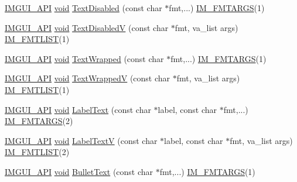 \begin{DoxyCompactItemize}
\item 
\hyperlink{imgui_8h_a43829975e84e45d1149597467a14bbf5}{I\+M\+G\+U\+I\+\_\+\+A\+PI} \hyperlink{imgui__impl__opengl3__loader_8h_ac668e7cffd9e2e9cfee428b9b2f34fa7}{void} \hyperlink{namespaceImGui_aa96bf14c5fa288e106820aeb4ba7fcb6}{Text\+Disabled} (const char $\ast$fmt,...) \hyperlink{imgui_8h_a1251c2f9ddac0873dbad8181bd82c9f1}{I\+M\+\_\+\+F\+M\+T\+A\+R\+GS}(1)
\item 
\hyperlink{imgui_8h_a43829975e84e45d1149597467a14bbf5}{I\+M\+G\+U\+I\+\_\+\+A\+PI} \hyperlink{imgui__impl__opengl3__loader_8h_ac668e7cffd9e2e9cfee428b9b2f34fa7}{void} \hyperlink{namespaceImGui_a5b128d4f12d7e33e95fb9cef7dce027e}{Text\+DisabledV} (const char $\ast$fmt, va\+\_\+list args) \hyperlink{imgui_8h_a047693beb7f899f5deab1e20202016b3}{I\+M\+\_\+\+F\+M\+T\+L\+I\+ST}(1)
\item 
\hyperlink{imgui_8h_a43829975e84e45d1149597467a14bbf5}{I\+M\+G\+U\+I\+\_\+\+A\+PI} \hyperlink{imgui__impl__opengl3__loader_8h_ac668e7cffd9e2e9cfee428b9b2f34fa7}{void} \hyperlink{namespaceImGui_ad57bb15c599e73b2ccc7c0f7de6e5823}{Text\+Wrapped} (const char $\ast$fmt,...) \hyperlink{imgui_8h_a1251c2f9ddac0873dbad8181bd82c9f1}{I\+M\+\_\+\+F\+M\+T\+A\+R\+GS}(1)
\item 
\hyperlink{imgui_8h_a43829975e84e45d1149597467a14bbf5}{I\+M\+G\+U\+I\+\_\+\+A\+PI} \hyperlink{imgui__impl__opengl3__loader_8h_ac668e7cffd9e2e9cfee428b9b2f34fa7}{void} \hyperlink{namespaceImGui_a9019a388cd0c410bcb3d3ae63a008123}{Text\+WrappedV} (const char $\ast$fmt, va\+\_\+list args) \hyperlink{imgui_8h_a047693beb7f899f5deab1e20202016b3}{I\+M\+\_\+\+F\+M\+T\+L\+I\+ST}(1)
\item 
\hyperlink{imgui_8h_a43829975e84e45d1149597467a14bbf5}{I\+M\+G\+U\+I\+\_\+\+A\+PI} \hyperlink{imgui__impl__opengl3__loader_8h_ac668e7cffd9e2e9cfee428b9b2f34fa7}{void} \hyperlink{namespaceImGui_ad92ccfbc33d448ff40cfcf9219177344}{Label\+Text} (const char $\ast$label, const char $\ast$fmt,...) \hyperlink{imgui_8h_a1251c2f9ddac0873dbad8181bd82c9f1}{I\+M\+\_\+\+F\+M\+T\+A\+R\+GS}(2)
\item 
\hyperlink{imgui_8h_a43829975e84e45d1149597467a14bbf5}{I\+M\+G\+U\+I\+\_\+\+A\+PI} \hyperlink{imgui__impl__opengl3__loader_8h_ac668e7cffd9e2e9cfee428b9b2f34fa7}{void} \hyperlink{namespaceImGui_a55e5a7edb676a8f5cd7f65443138a8a0}{Label\+TextV} (const char $\ast$label, const char $\ast$fmt, va\+\_\+list args) \hyperlink{imgui_8h_a047693beb7f899f5deab1e20202016b3}{I\+M\+\_\+\+F\+M\+T\+L\+I\+ST}(2)
\item 
\hyperlink{imgui_8h_a43829975e84e45d1149597467a14bbf5}{I\+M\+G\+U\+I\+\_\+\+A\+PI} \hyperlink{imgui__impl__opengl3__loader_8h_ac668e7cffd9e2e9cfee428b9b2f34fa7}{void} \hyperlink{namespaceImGui_af8d34d563b17c683943a0fa7bf5807bc}{Bullet\+Text} (const char $\ast$fmt,...) \hyperlink{imgui_8h_a1251c2f9ddac0873dbad8181bd82c9f1}{I\+M\+\_\+\+F\+M\+T\+A\+R\+GS}(1)

\end{DoxyCompactItemize}
